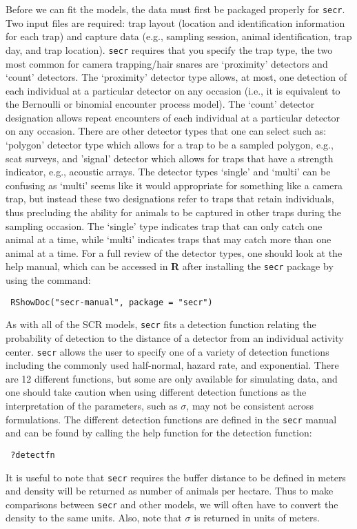Before we can fit the models, the data must first be packaged properly
for 
\mbox{\tt secr}.  Two input files are required: trap layout (location and
identification information for each trap) and capture data (e.g.,
sampling session, animal identification, trap day, and trap location).
\mbox{\tt secr} requires that you specify the trap type, the two most common for
camera trapping/hair snares are ‘proximity’ detectors and ‘count’
detectors.  The `proximity' detector type allows, at most, one
detection of each individual at a particular detector on any occasion
(i.e., it is equivalent to the Bernoulli or binomial encounter process
model).
The ‘count’ detector designation allows repeat encounters of each
individual at a particular detector on any occasion.  There are other
detector types that one can select such as: `polygon' detector type
which allows for a trap to be a sampled polygon, e.g., scat surveys,
and 'signal' detector which allows for traps that have a strength
indicator, e.g., acoustic arrays.  The detector types ‘single’ and
‘multi’ can be confusing as ‘multi’ seems like it would appropriate
for something like a camera trap, but instead these two designations
refer to traps that retain individuals, thus precluding the ability
for animals to be captured in other traps during the sampling
occasion.  The ‘single’ type indicates trap that can only catch one
animal at a time, while ‘multi’ indicates traps that may catch more
than one animal at a time.  For a full review of the detector types,
one should look at the help manual, which can be accessed in {\bf R} after
installing the \mbox{\tt secr} package by using the command:
\begin{verbatim}
 RShowDoc("secr-manual", package = "secr")
\end{verbatim}
As with all of the SCR models, \mbox{\tt secr} fits a detection function relating
the probability of detection to the distance of a detector from an
individual activity center. \mbox{\tt secr} allows the user to specify one of a
variety of detection functions including the commonly used
half-normal, hazard rate, and exponential.  There are 12 different
functions, but some are only available for simulating data, and one
should take caution when using different detection functions as the
interpretation of the parameters, such as $\sigma$, may not be consistent
across formulations.  The different detection functions are defined in
the \mbox{\tt secr} manual and can be found by calling the help function for the
detection function:
\begin{verbatim}
 ?detectfn
\end{verbatim}
It is useful to note that \mbox{\tt secr} requires the buffer distance to be
defined in meters and density will be returned as number of animals
per hectare.  Thus to make comparisons between \mbox{\tt secr} and other models,
we will often have to convert the density to the same units.  Also,
note that $\sigma$ is returned in units of meters.



